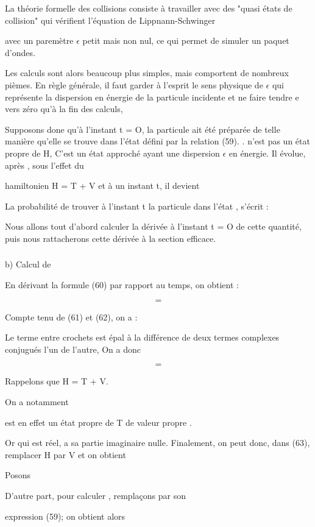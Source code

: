 La théorie formelle des collisions consiste à travailler avec
des "quasi états de collision"  qui vérifient l'équation de
Lippnann-Schwinger

avec un paremètre $\epsilon$ petit mais non nul, ce qui permet de simuler un paquet
d'ondes.

Les calculs sont alors beaucoup plus simples, mais comportent de
nombreux pièmes. En règle générale, il faut garder à l'esprit le sens physique
de $\epsilon$ qui représente la dispersion en énergie de la particule incidente
et ne faire tendre e vers zéro qu'à la fin des calculs,

Supposons done qu'à l'instant t = O, la particule ait été préparée
de telle manière qu'elle se trouve dans l'état  défini par la relation (59). .
n'est pas un état propre de H, C'est un état approché
ayant une dispersion $\epsilon$ en énergie. Il évolue, après , sous l'effet du

hamiltonien H = T + V et à un instant t, il devient

La probabilité de trouver à l'instant t la particule dans l'état ,
 s'écrit :


Nous allons tout d'abord calculer la dérivée à l'instant t = O de cette
quantité, puis nous rattacherons cette dérivée à la section efficace.

 

\subsubsection{}%
b) Calcul de 

En dérivant la formule (60) par rapport au temps, on obtient :

\[
\tag{62}=
\]

Compte tenu de (61) et (62), on a :

Le terme entre crochets est épal à la différence de deux termes complexes
conjugués l'un de l'autre, On a donc

\[
\tag{63}=
\]

Rappelons que H = T + V.

On a notamment

 est en effet un état propre de T de valeur propre .

Or  qui est réel, a sa partie imaginaire nulle.
Finalement, on peut donc, dans (63), remplacer H par V et on obtient

Posons

D'autre part, pour calculer , remplaçons  par son

expression (59); on obtient alors

